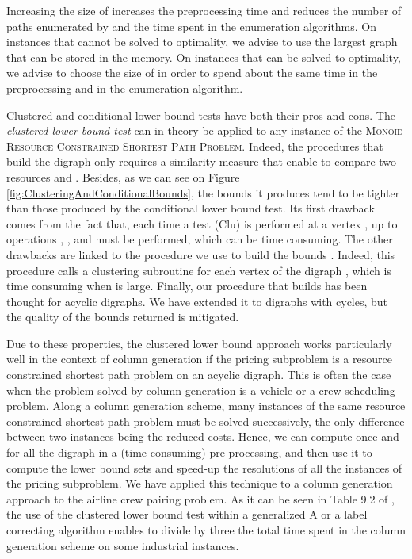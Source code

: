 \documentclass[11pt]{amsart}
\theoremstyle{plain}
\theoremstyle{remark}
\newcommand{\MRCSP}{\textsc{Monoid Resource Constrained Shortest Path Problem}\xspace}
\begin{document}
Increasing the size of  increases the preprocessing time and reduces the number of paths enumerated by and the time spent in the enumeration algorithms. On instances that cannot be solved to optimality, we advise to use the largest graph  that can be stored in the memory. On instances that can be solved to optimality, we advise to choose the size of  in order to spend about the same time in the preprocessing and in the enumeration algorithm.



Clustered and conditional lower bound tests have both their pros and cons. 
The \emph{clustered lower bound test} can in theory be applied to any instance of the \MRCSP. Indeed, the procedures that build the digraph  only requires a similarity measure that enable to compare two resources  and . Besides, as we can see on Figure \ref{fig:ClusteringAndConditionalBounds}, the bounds it produces tend to be tighter than those produced by the conditional lower bound test. Its first drawback comes from the fact that, each time a test (Clu) is performed at a vertex , up to  operations , , and  must be performed, which can be time consuming. The other drawbacks are linked to the procedure we use to build the bounds . Indeed, this procedure calls a clustering subroutine for each vertex  of the digraph  \cite{parmentier2016thesis}, which is time consuming when  is large. Finally, our procedure that builds  has been thought for acyclic digraphs. We have extended it to digraphs with cycles, but the quality of the bounds returned is mitigated.

Due to these properties, the clustered lower bound approach works particularly well in the context of column generation if the pricing subproblem is a resource constrained shortest path problem on an acyclic digraph. This is often the case when the problem solved by column generation is a vehicle or a crew scheduling problem. Along a column generation scheme, many instances of the same resource constrained shortest path problem must be solved successively, the only difference between two instances being the reduced costs. Hence, we can compute once and for all the digraph  in a (time-consuming) pre-processing, and then use it to compute the lower bound sets  and speed-up the resolutions of all the instances of the pricing subproblem. We have applied this technique to a column generation approach to the airline crew pairing problem. As it can be seen in Table 9.2 of \cite{parmentier2016thesis}, the use of the clustered lower bound test within a generalized A or a label correcting algorithm enables to divide by three the total time spent in the column generation scheme on some industrial instances.
\end{document}
